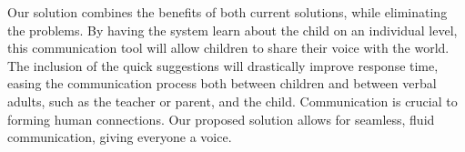 Our solution combines the benefits of both current solutions, while eliminating the problems. By having the system learn about the child on an individual level, this communication tool will allow children to share their voice with the world. The inclusion of the quick suggestions will drastically improve response time, easing the communication process both between children and between verbal adults, such as the teacher or parent, and the child. Communication is crucial to forming human connections. Our proposed solution allows for seamless, fluid communication, giving everyone a voice.
